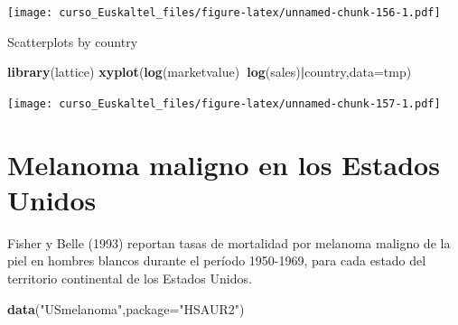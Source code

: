 \documentclass[]{book}
\newenvironment{Shaded}{\begin{snugshade}}{\end{snugshade}}
\newcommand{\KeywordTok}[1]{\textcolor[rgb]{0.13,0.29,0.53}{\textbf{#1}}}
\newcommand{\DataTypeTok}[1]{\textcolor[rgb]{0.13,0.29,0.53}{#1}}
\newcommand{\DecValTok}[1]{\textcolor[rgb]{0.00,0.00,0.81}{#1}}
\newcommand{\StringTok}[1]{\textcolor[rgb]{0.31,0.60,0.02}{#1}}
\newcommand{\OtherTok}[1]{\textcolor[rgb]{0.56,0.35,0.01}{#1}}
\newcommand{\OperatorTok}[1]{\textcolor[rgb]{0.81,0.36,0.00}{\textbf{#1}}}
\newcommand{\NormalTok}[1]{#1}
\begin{document}
\begin{Shaded}
\end{Shaded}

\texttt{[image: curso\_Euskaltel\_files/figure-latex/unnamed-chunk-156-1.pdf]}

Scatterplots by country

\begin{Shaded}
\begin{Highlighting}[]
\KeywordTok{library}\NormalTok{(lattice)}
\KeywordTok{xyplot}\NormalTok{(}\KeywordTok{log}\NormalTok{(marketvalue)}\OperatorTok{~}\KeywordTok{log}\NormalTok{(sales)}\OperatorTok{|}\NormalTok{country,}\DataTypeTok{data=}\NormalTok{tmp)}
\end{Highlighting}
\end{Shaded}

\texttt{[image: curso\_Euskaltel\_files/figure-latex/unnamed-chunk-157-1.pdf]}

\section{Melanoma maligno en los Estados
Unidos}\label{melanoma-maligno-en-los-estados-unidos}

Fisher y Belle (1993) reportan tasas de mortalidad por melanoma maligno
de la piel en hombres blancos durante el período 1950-1969, para cada
estado del territorio continental de los Estados Unidos.

\begin{Shaded}
\begin{Highlighting}[]
\KeywordTok{data}\NormalTok{(}\StringTok{"USmelanoma"}\NormalTok{,}\DataTypeTok{package=}\StringTok{"HSAUR2"}\NormalTok{)}
\end{Highlighting}
\end{Shaded}
\end{document}
